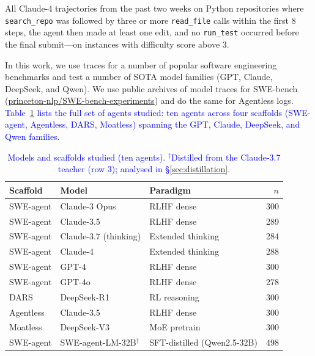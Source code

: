 \documentclass[12pt]{article}
\begin{document}
\begin{tcolorbox}[colback=black!3, colframe=black!30, boxrule=0.4pt, left=10pt, right=10pt, top=8pt, bottom=8pt, fontupper=\small]
All Claude-4 trajectories from the past two weeks on Python repositories where \texttt{search\_repo} was followed by three or more \texttt{read\_file} calls within the first 8 steps, the agent then made at least one edit, and no \texttt{run\_test} occurred before the final submit---on instances with difficulty score above 3.
\end{tcolorbox}

In this work, we use traces for a number of popular software engineering benchmarks and test a number of SOTA model families (GPT, Claude, DeepSeek, and Qwen). We use public archives of model traces for SWE-bench (\url{princeton-nlp/SWE-bench-experiments}) and do the same for Agentless logs. \textcolor{blue}{Table~\ref{tab:models} lists the full set of agents studied: ten agents across four scaffolds (SWE-agent, Agentless, DARS, Moatless) spanning the GPT, Claude, DeepSeek, and Qwen families.}

\begin{table}[H]
\centering\small
\begin{tabular}{lllr}
\toprule
\textbf{Scaffold} & \textbf{Model} & \textbf{Paradigm} & \textbf{$n$} \\
\midrule
\rowcolor{claudebg} SWE-agent & Claude-3 Opus        & RLHF dense        & 300 \\
\rowcolor{claudebg} SWE-agent & Claude-3.5           & RLHF dense        & 289 \\
\rowcolor{claudebg} SWE-agent & Claude-3.7 (thinking)& Extended thinking & 284 \\
\rowcolor{claudebg} SWE-agent & Claude-4             & Extended thinking & 288 \\
\rowcolor{gptbg}    SWE-agent & GPT-4                & RLHF dense        & 300 \\
\rowcolor{gptbg}    SWE-agent & GPT-4o               & RLHF dense        & 278 \\
\rowcolor{owbg}     DARS      & DeepSeek-R1          & RL reasoning      & 300 \\
\rowcolor{owbg}     Agentless & Claude-3.5           & RLHF dense        & 300 \\
\rowcolor{owbg}     Moatless  & DeepSeek-V3          & MoE pretrain      & 300 \\
\rowcolor{owbg}     SWE-agent & SWE-agent-LM-32B$^\dagger$ & SFT-distilled (Qwen2.5-32B) & 498 \\
\bottomrule
\end{tabular}
\caption{\textcolor{blue}{Models and scaffolds studied (ten agents). $^\dagger$Distilled from the Claude-3.7 teacher (row 3); analysed in \S\ref{sec:distillation}.}}
\label{tab:models}
\end{table}
\end{document}
